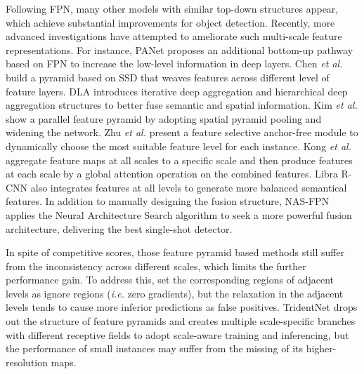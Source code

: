 \documentclass[10pt,twocolumn,letterpaper]{article}
\begin{document}
Following FPN, many other models with similar top-down structures \cite{dssd,ron,stairnet,refinedet,yolov3}appear, which achieve substantial improvements for object detection. Recently, more advanced investigations have attempted to ameliorate such multi-scale feature representations. For instance, PANet \cite{panet} proposes an additional bottom-up pathway based on FPN to increase the low-level information in deep layers. Chen \emph{et al.} \cite{weaving} build a pyramid based on SSD that weaves features across different level of feature layers. DLA \cite{dla} introduces iterative deep aggregation and hierarchical deep aggregation structures to better fuse semantic and spatial information. Kim \emph{et al.} \cite{pfp} show a parallel feature pyramid by adopting spatial pyramid pooling and widening the network. Zhu \emph{et al.} \cite{FSAF} present a feature selective anchor-free module to dynamically choose the most suitable feature level for each instance. Kong \emph{et al.} \cite{kong-eccv} aggregate feature maps at all scales to a specific scale and then produce features at each scale by a global attention operation on the combined features. Libra R-CNN \cite{libra} also integrates features at all levels to generate more balanced semantical features. In addition to manually designing the fusion structure, NAS-FPN \cite{nas-fpn} applies the Neural Architecture Search algorithm to seek a more powerful fusion architecture, delivering the best single-shot detector.

In spite of competitive scores, those feature pyramid based methods still suffer from the inconsistency across different scales, which limits the further performance gain. To address this, \cite{guide,FSAF} set the corresponding regions of adjacent levels as ignore regions (\emph{i.e.} zero gradients), but the relaxation in the adjacent levels tends to cause more inferior predictions as false positives. TridentNet \cite{trident} drops out the structure of feature pyramids and creates multiple scale-specific branches with different receptive fields to adopt scale-aware training and inferencing, but the performance of small instances may suffer from the missing of its higher-resolution maps. 
\end{document}
